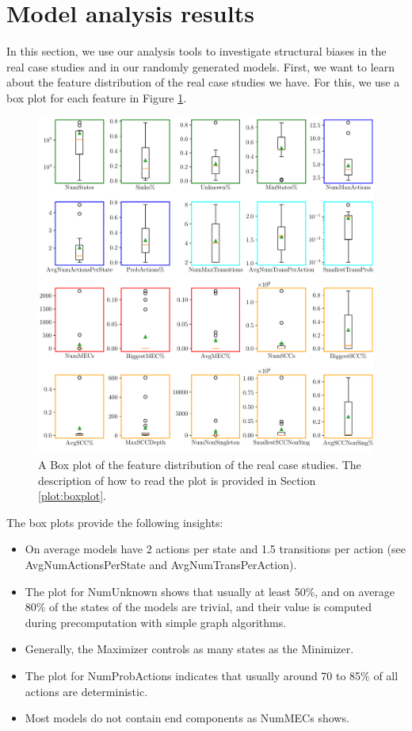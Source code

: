 \section{Model analysis results}
In this section, we use our analysis tools to investigate structural biases in the real case studies and in our randomly generated models.
First, we want to learn about the feature distribution of the real case studies we have. 
For this, we use a box plot for each feature in Figure \ref{fig:Real_FeatureDistribution}.
\begin{figure}[h!]
    \centering
    \includegraphics[width=1\textwidth]{figures/Real_FeatureDistribution.pdf}
    \caption[Feature Distribution of the case studies]{
        A Box plot of the feature distribution of the real case studies.
        The description of how to read the plot is provided in Section \ref{plot:boxplot}.
    }
    \label{fig:Real_FeatureDistribution}
\end{figure}
The box plots provide the following insights:
\begin{itemize} \label{insights:realDistribution}
    \item On average models have 2 actions per state and 1.5 transitions per action (see AvgNumActionsPerState and AvgNumTransPerAction).
    \item The plot for NumUnknown shows that usually at least 50\%, and on average 80\% of the states of the models are trivial, and their value is computed during precomputation with simple graph algorithms. 
    \item Generally, the Maximizer controls as many states as the Minimizer.
    \item The plot for NumProbActions indicates that usually around 70 to 85\% of all actions are deterministic.
    \item Most models do not contain end components as NumMECs shows.
\end{itemize}

